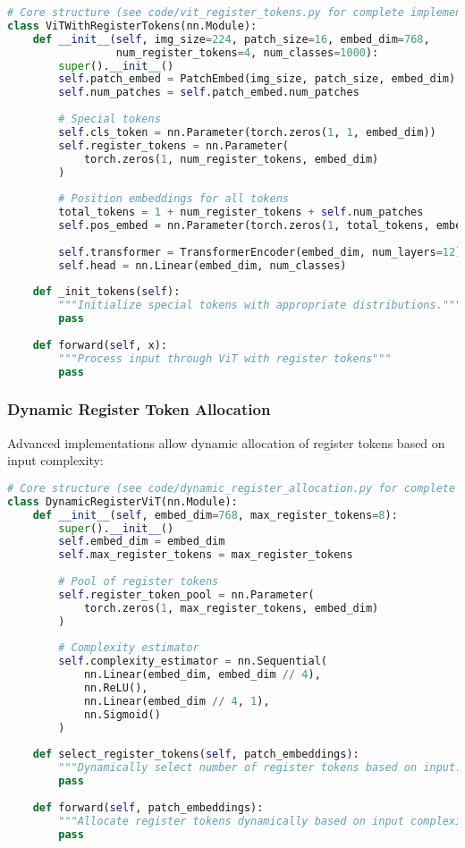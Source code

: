 \begin{lstlisting}[language=Python, caption=Register token integration in Vision Transformer]
# Core structure (see code/vit_register_tokens.py for complete implementation)
class ViTWithRegisterTokens(nn.Module):
    def __init__(self, img_size=224, patch_size=16, embed_dim=768, 
                 num_register_tokens=4, num_classes=1000):
        super().__init__()
        self.patch_embed = PatchEmbed(img_size, patch_size, embed_dim)
        self.num_patches = self.patch_embed.num_patches
        
        # Special tokens
        self.cls_token = nn.Parameter(torch.zeros(1, 1, embed_dim))
        self.register_tokens = nn.Parameter(
            torch.zeros(1, num_register_tokens, embed_dim)
        )
        
        # Position embeddings for all tokens
        total_tokens = 1 + num_register_tokens + self.num_patches
        self.pos_embed = nn.Parameter(torch.zeros(1, total_tokens, embed_dim))
        
        self.transformer = TransformerEncoder(embed_dim, num_layers=12)
        self.head = nn.Linear(embed_dim, num_classes)
    
    def _init_tokens(self):
        """Initialize special tokens with appropriate distributions."""
        pass
    
    def forward(self, x):
        """Process input through ViT with register tokens"""
        pass
\end{lstlisting}

\subsubsection{Dynamic Register Token Allocation}

Advanced implementations allow dynamic allocation of register tokens based on input complexity:

\begin{lstlisting}[language=Python, caption=Dynamic register token allocation]
# Core structure (see code/dynamic_register_allocation.py for complete implementation)
class DynamicRegisterViT(nn.Module):
    def __init__(self, embed_dim=768, max_register_tokens=8):
        super().__init__()
        self.embed_dim = embed_dim
        self.max_register_tokens = max_register_tokens
        
        # Pool of register tokens
        self.register_token_pool = nn.Parameter(
            torch.zeros(1, max_register_tokens, embed_dim)
        )
        
        # Complexity estimator
        self.complexity_estimator = nn.Sequential(
            nn.Linear(embed_dim, embed_dim // 4),
            nn.ReLU(),
            nn.Linear(embed_dim // 4, 1),
            nn.Sigmoid()
        )
    
    def select_register_tokens(self, patch_embeddings):
        """Dynamically select number of register tokens based on input."""
        pass
    
    def forward(self, patch_embeddings):
        """Allocate register tokens dynamically based on input complexity"""
        pass
\end{lstlisting}

